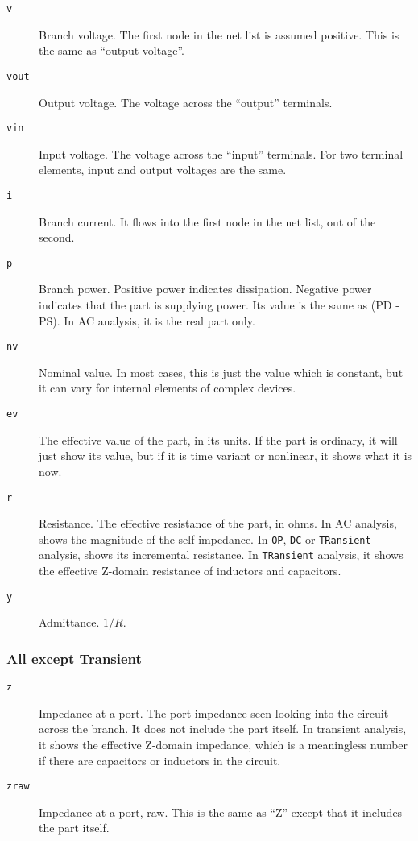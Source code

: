 \begin{description}

\item[{\tt v}] Branch voltage.  The first node in the net list is assumed
positive.  This is the same as ``output voltage''.

\item[{\tt vout}] Output voltage.  The voltage across the ``output''
terminals. 

\item[{\tt vin}] Input voltage.  The voltage across the ``input''
terminals.  For two terminal elements, input and output voltages are
the same.

\item[{\tt i}] Branch current.  It flows into the first node in the net
list, out of the second.

\item[{\tt p}] Branch power.  Positive power indicates dissipation. 
Negative power indicates that the part is supplying power.  Its value 
is the same as (PD - PS).  In AC analysis, it is the real part only.

\item[{\tt nv}] Nominal value.  In most cases, this is just the value
which is constant, but it can vary for internal elements of complex
devices. 

\item[{\tt ev}] The effective value of the part, in its units.  If the part
is ordinary, it will just show its value, but if it is time variant or
nonlinear, it shows what it is now.

\item[{\tt r}] Resistance.  The effective resistance of the part, in ohms.
In AC analysis, shows the magnitude of the self impedance.  In {\tt OP},
{\tt DC} or {\tt TRansient} analysis, shows its incremental resistance.  In
{\tt TRansient} analysis, it shows the effective Z-domain resistance of
inductors and capacitors.

\item[{\tt y}] Admittance.  $1/R$.

\end{description}
\subsubsection{All except Transient}

\begin{description}

\item[{\tt z}] Impedance at a port.  The port impedance seen looking
into the circuit across the branch.  It does not include the part
itself.  In transient analysis, it shows the effective Z-domain
impedance, which is a meaningless number if there are capacitors or
inductors in the circuit.

\item[{\tt zraw}] Impedance at a port, raw.  This is the same as ``Z'' 
except that it includes the part itself.

\end{description}
